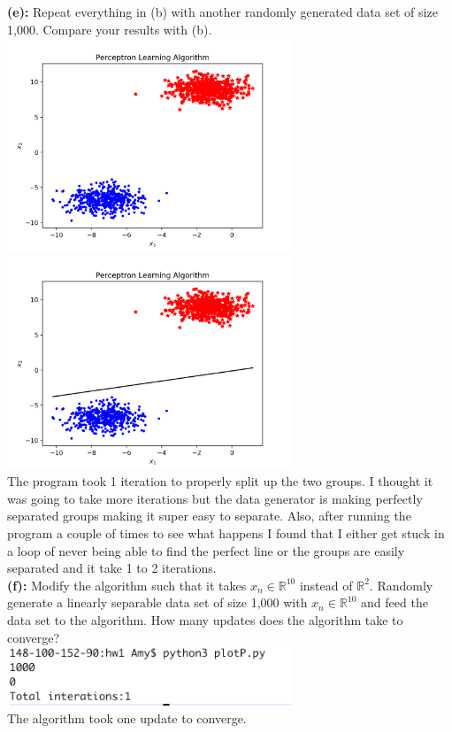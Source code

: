 \documentclass[a4paper]{article}
\begin{document}
\indent \textbf{(e):} Repeat everything in (b) with another randomly
generated data set of size 1,000. Compare your results with (b). \\
\includegraphics[width=85mm]{e_1.png} 
\includegraphics[width=85mm]{e_2.png} \\
The program took 1 iteration to properly split up the two groups.
I thought it was going to take more iterations but the 
data generator is making perfectly separated groups making 
it super easy to separate. Also, after running the program
a couple of times to see what happens I found that I either get 
stuck in a loop of never being able to find the perfect line
or the groups are easily separated and it take 1 to 2 iterations. 
\\


\indent \textbf{(f):} Modify the algorithm such that it takes 
$x_n \in \mathbb{R}^{10}$ instead of $\mathbb{R}^2$. Randomly generate
a linearly separable data set of size 1,000 with $x_n \in \mathbb{R}^{10}$
and feed the data set to the algorithm. How many updates does the 
algorithm take to converge? \\
\includegraphics[width=85mm]{f.png} \\
The algorithm took one update to converge. \\
\end{document}
